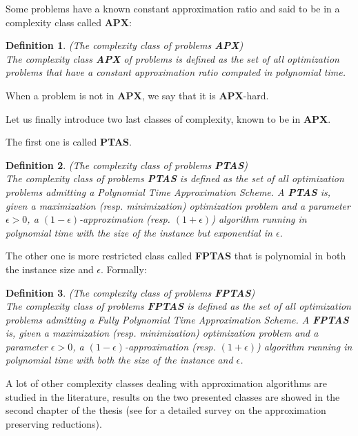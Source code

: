 \documentclass[a4paper]{book}
\newtheorem{definition}{Definition}
\begin{document}
Some problems have a known constant approximation ratio and said to be in a complexity class called \textbf{APX}:
\begin{definition}{\emph{(The complexity class of problems \textbf{APX})}}\\
The complexity class \emph{\textbf{APX}} of problems is defined as the set of all optimization problems that have a constant approximation ratio computed in polynomial time. 
\end{definition}

When a problem is not in \textbf{APX}, we say that it is \textbf{APX}-hard. 

Let us finally introduce two last classes of complexity, known to be in \textbf{APX}.

The first one is called \textbf{PTAS}.
\begin{definition}{\emph{(The complexity class of problems \textbf{PTAS})}}\\
The complexity class of problems \emph{\textbf{PTAS}} is defined as the set of all optimization problems admitting a Polynomial Time Approximation Scheme. A \emph{\textbf{PTAS}} is, given a maximization (resp. minimization) optimization problem and a parameter $\epsilon >0$, a $(1-\epsilon)$-approximation (resp. $(1+\epsilon)$) algorithm running in polynomial time with the size of the instance but exponential in $\epsilon$.

\end{definition}

The other one is more restricted class called \textbf{FPTAS} that is polynomial in both the instance size and $\epsilon$.
Formally:
\begin{definition}{\emph{(The complexity class of problems \textbf{FPTAS})}}\\
The complexity class of problems \emph{\textbf{FPTAS}} is defined as the set of all optimization problems admitting a Fully Polynomial Time Approximation Scheme. A \emph{\textbf{FPTAS}} is, given a maximization (resp. minimization) optimization problem and a parameter $\epsilon >0$, a $(1-\epsilon)$-approximation (resp. $(1+\epsilon)$) algorithm running in polynomial time with both the size of the instance and $\epsilon$.

\end{definition}

A lot of other complexity classes dealing with approximation algorithms are studied in the literature, results on the two presented classes are showed in the second chapter of the thesis (see \cite{ausiello2005approximability} for a detailed survey on the approximation preserving reductions). \\
\end{document}
